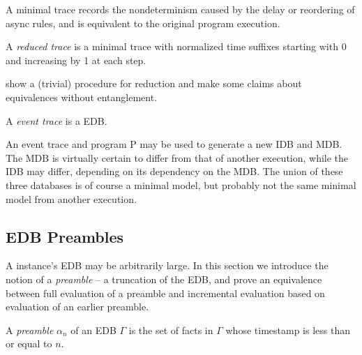 A minimal trace records the nondeterminism caused by the delay or reordering of async rules, and
is equivalent to the original program execution.  

\begin{definition}
A \emph{reduced trace} is a minimal trace with normalized time suffixes starting with 0 and increasing by 1 at each step.
\end{definition}

show a (trivial) procedure for reduction and make some claims about equivalences without entanglement.

\begin{definition}
A \emph{event trace} is a \lang EDB.
\end{definition}

An event trace and program P may be used to generate a new IDB and MDB.  The MDB is virtually certain to differ from that of another
execution, while the IDB may differ, depending on its dependency on the MDB.  The union of these three databases is of course a
minimal model, but probably not the same minimal model from another execution.  



\subsection{EDB Preambles}


A \slang instance's EDB may be arbitrarily large.  In this section we introduce
the notion of a {\em preamble} -- a truncation of the EDB, and prove an
equivalence between full evaluation of a preamble and incremental evaluation
based on evaluation of an earlier preamble.


\begin{definition}
A \emph{preamble} $\alpha_{n}$ of an EDB $\Gamma$ is the set of facts in $\Gamma$ whose timestamp is less than or equal to $n$.
\end{definition}

